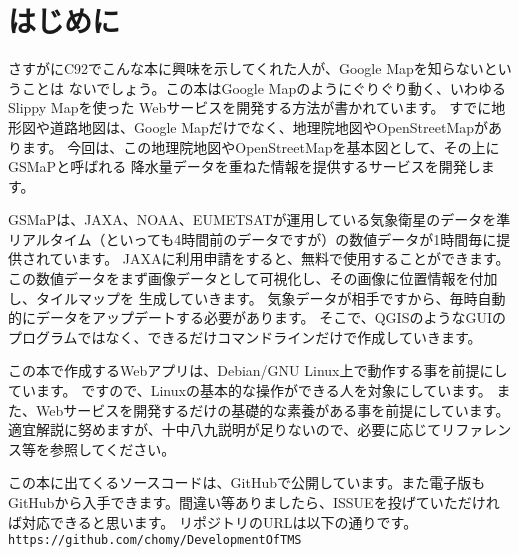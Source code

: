 \chapter*{はじめに}

さすがにC92でこんな本に興味を示してくれた人が、Google Mapを知らないということは
ないでしょう。この本はGoogle Mapのようにぐりぐり動く、いわゆるSlippy Mapを使った
Webサービスを開発する方法が書かれています。
すでに地形図や道路地図は、Google Mapだけでなく、地理院地図やOpenStreetMapがあります。
今回は、この地理院地図やOpenStreetMapを基本図として、その上にGSMaPと呼ばれる
降水量データを重ねた情報を提供するサービスを開発します。

GSMaPは、JAXA、NOAA、EUMETSATが運用している気象衛星のデータを準リアルタイム（といっても4時間前のデータですが）の数値データが1時間毎に提供されています。
JAXAに利用申請をすると、無料で使用することができます。
この数値データをまず画像データとして可視化し、その画像に位置情報を付加し、タイルマップを
生成していきます。
気象データが相手ですから、毎時自動的にデータをアップデートする必要があります。
そこで、QGISのようなGUIのプログラムではなく、できるだけコマンドラインだけで作成していきます。

この本で作成するWebアプリは、Debian/GNU Linux上で動作する事を前提にしています。
ですので、Linuxの基本的な操作ができる人を対象にしています。
また、Webサービスを開発するだけの基礎的な素養がある事を前提にしています。
適宜解説に努めますが、十中八九説明が足りないので、必要に応じてリファレンス等を参照してください。

この本に出てくるソースコードは、GitHubで公開しています。また電子版もGitHubから入手できます。間違い等ありましたら、ISSUEを投げていただければ対応できると思います。
リポジトリのURLは以下の通りです。\\
\texttt{https://github.com/chomy/DevelopmentOfTMS}


